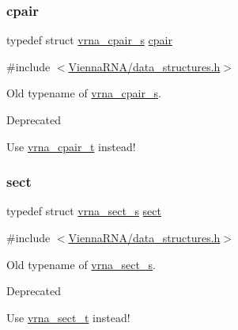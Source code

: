 \subsubsection{\texorpdfstring{cpair}{cpair}}
{\footnotesize\ttfamily typedef struct \mbox{\hyperlink{group__data__structures_structvrna__cpair__s}{vrna\+\_\+cpair\+\_\+s}} \mbox{\hyperlink{group__data__structures_ga8412f116a2eb07b59ade9e14ca7c5ef1}{cpair}}}



{\ttfamily \#include $<$\mbox{\hyperlink{data__structures_8h}{Vienna\+R\+N\+A/data\+\_\+structures.\+h}}$>$}



Old typename of \mbox{\hyperlink{group__data__structures_structvrna__cpair__s}{vrna\+\_\+cpair\+\_\+s}}. 

\begin{DoxyRefDesc}{Deprecated}
\item[\mbox{\hyperlink{deprecated__deprecated000049}{Deprecated}}]Use \mbox{\hyperlink{group__data__structures_gae4fc91141cc69c6d8eaf1332cb991ecc}{vrna\+\_\+cpair\+\_\+t}} instead! \end{DoxyRefDesc}
\mbox{\label{group__data__structures_gaaacedee1f05d3d45aa6764eca51a8876}} 
\subsubsection{\texorpdfstring{sect}{sect}}
{\footnotesize\ttfamily typedef struct \mbox{\hyperlink{group__data__structures_structvrna__sect__s}{vrna\+\_\+sect\+\_\+s}} \mbox{\hyperlink{group__data__structures_gaaacedee1f05d3d45aa6764eca51a8876}{sect}}}



{\ttfamily \#include $<$\mbox{\hyperlink{data__structures_8h}{Vienna\+R\+N\+A/data\+\_\+structures.\+h}}$>$}



Old typename of \mbox{\hyperlink{group__data__structures_structvrna__sect__s}{vrna\+\_\+sect\+\_\+s}}. 

\begin{DoxyRefDesc}{Deprecated}
\item[\mbox{\hyperlink{deprecated__deprecated000050}{Deprecated}}]Use \mbox{\hyperlink{group__data__structures_gacc9cdae790dac75a7024e7069c0d4400}{vrna\+\_\+sect\+\_\+t}} instead! \end{DoxyRefDesc}
\mbox{\label{group__data__structures_gaaeed53a7508c6ce549a98223e94b25df}} 
